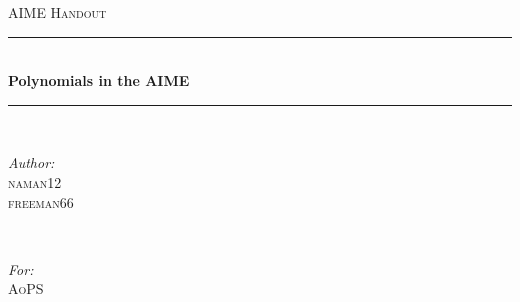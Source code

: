 \documentclass[11pt,titlepage]{scrartcl}
\begin{document}
\begin{titlepage}

\newcommand{\HRule}{\rule{\linewidth}{0.5mm}} %

\center %
 

\textsc{\LARGE AIME Handout}\\[1.5cm] %


\HRule \\[0.4cm]
{ \Huge \sffamily\bfseries Polynomials in the AIME }\\[0.4cm] %
\HRule \\[1.5cm]
 

\begin{minipage}{0.4\textwidth}
\begin{flushleft} \large
\emph{Author:}\\
\textsc{naman12}\\
\textsc{freeman66} %
\end{flushleft}
\end{minipage}
~
\begin{minipage}{0.5\textwidth}
\begin{flushright} \large
\emph{For:} \\
\textsc{AoPS}%
\end{flushright}
\end{minipage}\\[2cm]



\end{titlepage}
\end{document}
